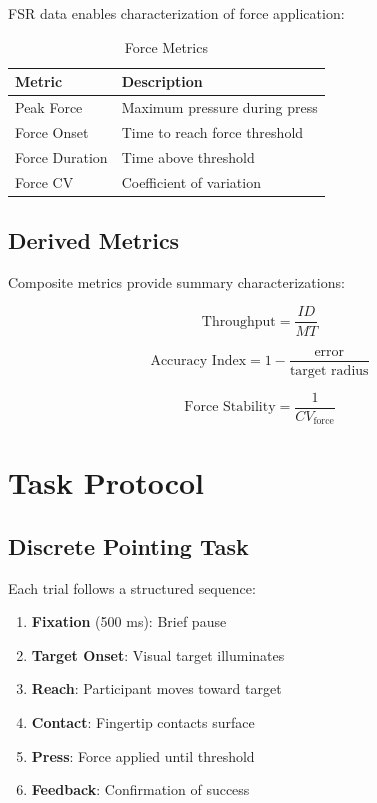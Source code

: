 \documentclass[11pt,twocolumn]{article}
\begin{document}
FSR data enables characterization of force application:

\begin{table}[H]
\centering
\caption{Force Metrics}
\begin{tabular}{lp{4cm}}
\toprule
\textbf{Metric} & \textbf{Description} \\
\midrule
Peak Force & Maximum pressure during press \\
Force Onset & Time to reach force threshold \\
Force Duration & Time above threshold \\
Force CV & Coefficient of variation \\
\bottomrule
\end{tabular}
\label{tab:force}
\end{table}

\subsection{Derived Metrics}

Composite metrics provide summary characterizations:

\begin{equation}
    \text{Throughput} = \frac{ID}{MT}
\end{equation}

\begin{equation}
    \text{Accuracy Index} = 1 - \frac{\text{error}}{\text{target radius}}
\end{equation}

\begin{equation}
    \text{Force Stability} = \frac{1}{CV_{\text{force}}}
\end{equation}

\section{Task Protocol}

\subsection{Discrete Pointing Task}

Each trial follows a structured sequence:

\begin{enumerate}
    \item \textbf{Fixation} (500 ms): Brief pause
    \item \textbf{Target Onset}: Visual target illuminates
    \item \textbf{Reach}: Participant moves toward target
    \item \textbf{Contact}: Fingertip contacts surface
    \item \textbf{Press}: Force applied until threshold
    \item \textbf{Feedback}: Confirmation of success
\end{enumerate}
\end{document}
